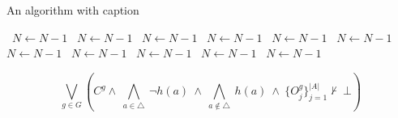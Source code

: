 \documentclass[a4paper]{article}
\begin{document}
\begin{algorithm}
\caption{An algorithm with caption}
\begin{algorithmic}
\    \State $N \gets N - 1$
\    \State $N \gets N - 1$
\    \State $N \gets N - 1$
\    \State $N \gets N - 1$
\    \State $N \gets N - 1$
\    \State $N \gets N - 1$
\    \State $N \gets N - 1$
\    \State $N \gets N - 1$
\    \State $N \gets N - 1$
\    \State $N \gets N - 1$
\    \State $N \gets N - 1$
\EndWhile
\end{algorithmic}
\end{algorithm}

\[\bigvee_{g\in G} (C^g \wedge\ \bigwedge_{a\in \triangle}\ \neg h(a)\ \wedge\ \bigwedge_{a\notin \triangle}\ h(a)\ \wedge\ \{O_j^g\}_{j=1}^{|A|} \nvdash\ \bot )\]
\end{document}
